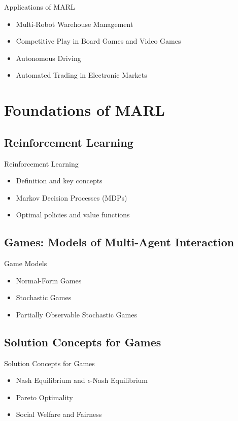 \documentclass{beamer}
\begin{document}
\begin{frame}{Applications of MARL}
  \begin{itemize}
    \item Multi-Robot Warehouse Management
    \item Competitive Play in Board Games and Video Games
    \item Autonomous Driving
    \item Automated Trading in Electronic Markets
  \end{itemize}
\end{frame}

\section{Foundations of MARL}

\subsection{Reinforcement Learning}
\begin{frame}{Reinforcement Learning}
  \begin{itemize}
    \item Definition and key concepts
    \item Markov Decision Processes (MDPs)
    \item Optimal policies and value functions
  \end{itemize}
\end{frame}

\subsection{Games: Models of Multi-Agent Interaction}
\begin{frame}{Game Models}
  \begin{itemize}
    \item Normal-Form Games
    \item Stochastic Games
    \item Partially Observable Stochastic Games
  \end{itemize}
\end{frame}

\subsection{Solution Concepts for Games}
\begin{frame}{Solution Concepts for Games}
  \begin{itemize}
    \item Nash Equilibrium and $\epsilon$-Nash Equilibrium
    \item Pareto Optimality
    \item Social Welfare and Fairness
  \end{itemize}
\end{frame}
\end{document}
